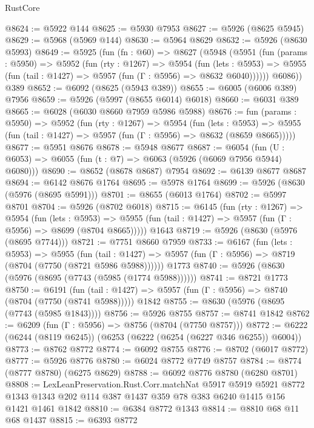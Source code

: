 \begin{lexlean}{RustCore}
\begin{coremodule}
@8624 := @5922 @144
@8625 := @5930 @7953
@8627 := @5926 (@8625 @5945)
@8629 := @5968 (@5969 @144)
@8630 := @5964 @8629
@8632 := @5926 (@8630 @5993)
@8649 := @5925
    (fun (fn : @60) =>
    @8627
      (@5948
        (@5951
          (fun (params : @5950) =>
          @5952
            (fun (rty : @1267) =>
            @5954
              (fun (lets : @5953) =>
              @5955 (fun (tail : @1427) => @5957 (fun (Γ : @5956) => @8632 @6040))))))
        @6086))
    @389
@8652 := @6092 (@8625 (@5943 @389))
@8655 := @6005 (@6006 @389) @7956
@8659 := @5926 (@5997 (@8655 @6014) @6018)
@8660 := @6031 @389
@8665 := @6028 (@6030 @8660 @7959 @5986 @5988)
@8676 := fun (params : @5950) =>
  @5952
    (fun (rty : @1267) =>
    @5954
      (fun (lets : @5953) =>
      @5955 (fun (tail : @1427) => @5957 (fun (Γ : @5956) => @8632 (@8659 @8665)))))
@8677 := @5951 @8676
@8678 := @5948 @8677
@8687 := @6054 (fun (U : @6053) => @6055 (fun (t : @7) => @6063 (@5926 (@6069 @7956 @5944) @6080)))
@8690 := @8652 (@8678 @8687) @7954
@8692 := @6139 @8677 @8687
@8694 := @6142 @8676 @1764
@8695 := @5978 @1764
@8699 := @5926 (@8630 (@5976 (@8695 @5991)))
@8701 := @8655 (@6013 @1764)
@8702 := @5997 @8701
@8704 := @5926 (@8702 @6018)
@8715 := @6145
    (fun (rty : @1267) =>
    @5954
      (fun (lets : @5953) =>
      @5955 (fun (tail : @1427) => @5957 (fun (Γ : @5956) => @8699 (@8704 @8665)))))
    @1643
@8719 := @5926 (@8630 (@5976 (@8695 @7744)))
@8721 := @7751 @8660 @7959
@8733 := @6167
    (fun (lets : @5953) =>
    @5955
      (fun (tail : @1427) => @5957 (fun (Γ : @5956) => @8719 (@8704 (@7750 (@8721 @5986 @5988))))))
    @1773
@8740 := @5926 (@8630 (@5976 (@8695 (@7743 (@5985 (@1774 @5988))))))
@8741 := @8721 @1773
@8750 := @6191
    (fun (tail : @1427) => @5957 (fun (Γ : @5956) => @8740 (@8704 (@7750 (@8741 @5988)))))
    @1842
@8755 := @8630 (@5976 (@8695 (@7743 (@5985 @1843))))
@8756 := @5926 @8755
@8757 := @8741 @1842
@8762 := @6209 (fun (Γ : @5956) => @8756 (@8704 (@7750 @8757)))
@8772 := @6222 (@6244 (@8119 @6245)) (@6253 (@6222 (@6254 (@6227 @346 @6255)) @6004))
@8773 := @8762 @8772
@8774 := @6092 @8755
@8776 := @8702 (@6017 @8772)
@8777 := @5926 @8776
@8780 := @6024 @8772 @7749 @8757
@8784 := @8774 (@8777 @8780) (@6275 @8629)
@8788 := @6092 @8776 @8780 (@6280 @8701)
@8808 := LexLeanPreservation.Rust.Corr.matchNat
    @5917
    @5919
    @5921
    @8772
    @1343
    @1343
    @202
    @114
    @387
    @1437
    @359
    @78
    @383
    @6240
    @1415
    @156
    @1421
    @1461
    @1842
@8810 := @6384 @8772 @1343
@8814 := @8810 @68 @11 @68 @1437
@8815 := @6393 @8772

\end{coremodule}
\end{lexlean}
